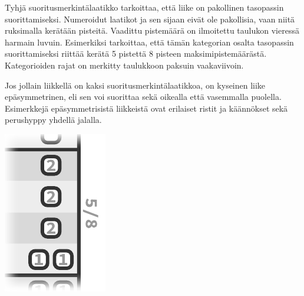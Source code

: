 \documentclass{article}
\begin{document}
\begin{minipage}[t]{0.8\textwidth} %
	\setlength{\parindent}{0em} %
	\setlength{\parskip}{.7em} %
	Tyhjä suoritusmerkintälaatikko
	tarkoittaa, että liike on pakollinen tasopassin suorittamiseksi.
	Numeroidut laatikot
	 ja %
	sen sijaan eivät ole pakollisia, vaan niitä ruksimalla
	kerätään pisteitä. Vaadittu pistemäärä on ilmoitettu taulukon vieressä
	harmain luvuin. Esimerkiksi
	tarkoittaa, että tämän kategorian osalta tasopassin suorittamiseksi riittää
	kerätä 5 pistettä 8 pisteen maksimipistemäärästä. Kategorioiden rajat on
	merkitty taulukkoon paksuin vaakaviivoin.

	Jos jollain liikkellä on kaksi suoritusmerkintälaatikkoa, on kyseinen liike
	epäsymmetrinen, eli sen voi suorittaa sekä oikealla että vasemmalla
	puolella. Esimerkkejä epäsymmetrisistä liikkeistä ovat erilaiset ristit ja
	käännökset sekä perushyppy yhdellä jalalla.
\end{minipage}%
\begin{minipage}[t]{0.2\textwidth} %
	\vspace*{0em}
	\raggedleft%
	\includegraphics[scale=.75]{kategoriaesimerkki.pdf}
\end{minipage}%
\newpage
\vspace*{\paperheight}
\end{document}
